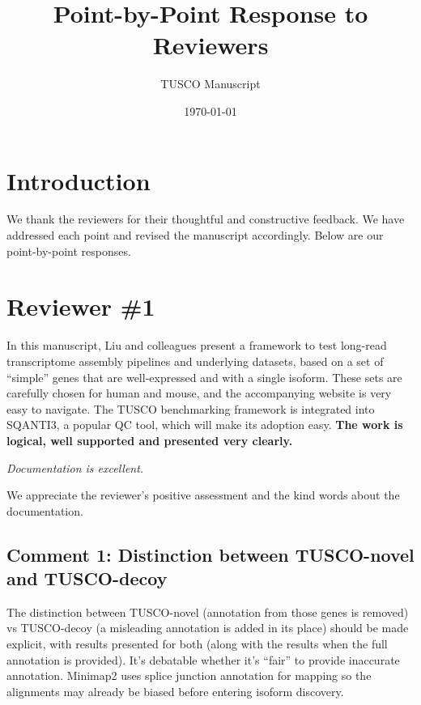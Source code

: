 \documentclass[11pt]{article}
\title{\textbf{Point-by-Point Response to Reviewers}}
\author{TUSCO Manuscript}
\date{\today}
\begin{document}
\maketitle

\tableofcontents
\newpage

\section*{Introduction}

We thank the reviewers for their thoughtful and constructive feedback. We have addressed each point and revised the manuscript accordingly. Below are our point-by-point responses.

\newpage

\section{Reviewer \#1}

\begin{positiveremarks}
In this manuscript, Liu and colleagues present a framework to test long-read transcriptome assembly pipelines and underlying datasets, based on a set of ``simple'' genes that are well-expressed and with a single isoform. These sets are carefully chosen for human and mouse, and the accompanying website is very easy to navigate. The TUSCO benchmarking framework is integrated into SQANTI3, a popular QC tool, which will make its adoption easy. \textbf{The work is logical, well supported and presented very clearly.}

\vspace{0.2cm}
\textit{Documentation is excellent.}
\end{positiveremarks}

\begin{responseboxnew}
We appreciate the reviewer's positive assessment and the kind words about the documentation.
\end{responseboxnew}

\subsection{Comment 1: Distinction between TUSCO-novel and TUSCO-decoy}

\begin{reviewercomment}
The distinction between TUSCO-novel (annotation from those genes is removed) vs TUSCO-decoy (a misleading annotation is added in its place) should be made explicit, with results presented for both (along with the results when the full annotation is provided). It's debatable whether it's ``fair'' to provide inaccurate annotation. Minimap2 uses splice junction annotation for mapping so the alignments may already be biased before entering isoform discovery.
\end{reviewercomment}
\end{document}
